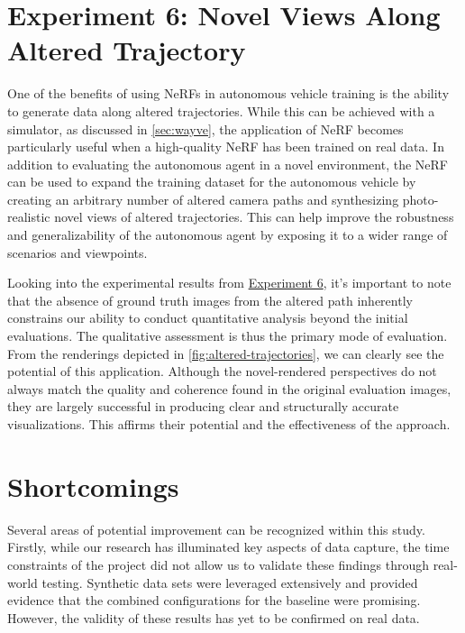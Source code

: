 \begin{comment}
- The estimation could be further improved by investigating techniques for leveraging more of the contained data.
- The NAPLab car's accelerometer could be used to calculate roll and pitch.
- LiDAR data could be used for further pose estimation
\end{comment}





\section{Experiment 6: Novel Views Along Altered Trajectory}
One of the benefits of using NeRFs in autonomous vehicle training is the ability to generate data along altered trajectories. While this can be achieved with a simulator, as discussed in \autoref{sec:wayve}, the application of NeRF becomes particularly useful when a high-quality NeRF has been trained on real data. In addition to evaluating the autonomous agent in a novel environment, the NeRF can be used to expand the training dataset for the autonomous vehicle by creating an arbitrary number of altered camera paths and synthesizing photo-realistic novel views of altered trajectories. This can help improve the robustness and generalizability of the autonomous agent by exposing it to a wider range of scenarios and viewpoints.

Looking into the experimental results from \hyperref[sec:altered-trajectories]{Experiment 6}, it's important to note that the absence of ground truth images from the altered path inherently constrains our ability to conduct quantitative analysis beyond the initial evaluations. The qualitative assessment is thus the primary mode of evaluation. From the renderings depicted in \autoref{fig:altered-trajectories}, we can clearly see the potential of this application. Although the novel-rendered perspectives do not always match the quality and coherence found in the original evaluation images, they are largely successful in producing clear and structurally accurate visualizations. This affirms their potential and the effectiveness of the approach.



\section{Shortcomings}
Several areas of potential improvement can be recognized within this study. Firstly, while our research has illuminated key aspects of data capture, the time constraints of the project did not allow us to validate these findings through real-world testing. Synthetic data sets were leveraged extensively and provided evidence that the combined configurations for the baseline were promising. However, the validity of these results has yet to be confirmed on real data.

